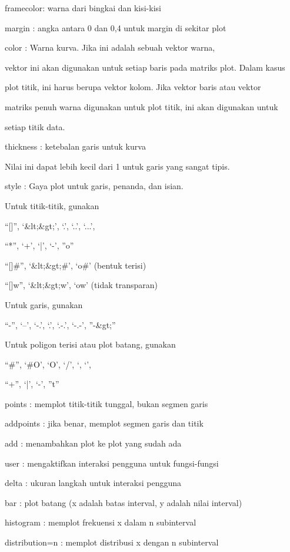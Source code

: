 \documentclass{article}
\begin{document}
framecolor: warna dari bingkai dan kisi-kisi


margin : angka antara 0 dan 0,4 untuk margin di sekitar plot


color : Warna kurva. Jika ini adalah sebuah vektor warna,


           vektor ini akan digunakan untuk setiap baris pada matriks
plot. Dalam kasus


          plot titik, ini harus berupa vektor kolom. Jika vektor baris
atau vektor


            matriks penuh warna digunakan untuk plot titik, ini akan
digunakan untuk


           setiap titik data.


thickness : ketebalan garis untuk kurva


            Nilai ini dapat lebih kecil dari 1 untuk garis yang sangat
tipis.


style : Gaya plot untuk garis, penanda, dan isian.


            Untuk titik-titik, gunakan


            “[]”, ‘&lt;&gt;’, ‘.’, ‘..’, ‘...’,


           “*”, ‘+’, ‘|’, ‘-’, ”o”


            “[]#”, ‘&lt;&gt;#’, ‘o#’ (bentuk terisi)


            “[]w”, ‘&lt;&gt;w’, ‘ow’ (tidak transparan)


            Untuk garis, gunakan


            “-”, ‘--’, ‘-.’, ‘.’, ‘.-.’, ‘-.-’, ”-&gt;”


            Untuk poligon terisi atau plot batang, gunakan


            “#”, ‘#O’, ‘O’, ‘/’, ‘\’, ‘\/’,


            “+”, ‘|’, ‘-’, ”t”


points : memplot titik-titik tunggal, bukan segmen garis


addpoints : jika benar, memplot segmen garis dan titik


add : menambahkan plot ke plot yang sudah ada


user : mengaktifkan interaksi pengguna untuk fungsi-fungsi


delta : ukuran langkah untuk interaksi pengguna


bar : plot batang (x adalah batas interval, y adalah nilai interval)


histogram : memplot frekuensi x dalam n subinterval


distribution=n : memplot distribusi x dengan n subinterval
\end{document}
